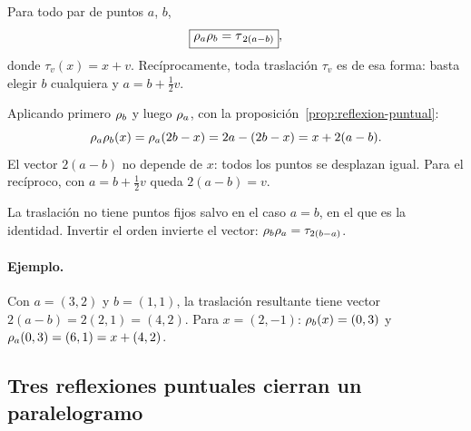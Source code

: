 \begin{proposicion}\label{prop:dos-puntuales}
Para todo par de puntos \(a\), \(b\),
\[
  \boxed{\rho_{a}\rho_{b}=\tau_{\,2(a-b)}},
\]
donde \(\tau_v(x)=x+v\). Recíprocamente, toda traslación \(\tau_v\) es de esa forma: basta elegir
\(b\) cualquiera y \(a=b+\tfrac12v\).
\end{proposicion}

\begin{demostracion}
Aplicando primero \(\rho_{b}\) y luego \(\rho_{a}\), con la
proposición~\ref{prop:reflexion-puntual}:
\[
  \rho_{a}\rho_{b}(x)=\rho_{a}(2b-x)=2a-(2b-x)=x+2(a-b).
\]
El vector \(2(a-b)\) no depende de \(x\): todos los puntos se desplazan igual. Para el
recíproco, con \(a=b+\frac12v\) queda \(2(a-b)=v\).
\end{demostracion}

La traslación no tiene puntos fijos salvo en el caso \(a=b\), en el que es la identidad.
Invertir el orden invierte el vector: \(\rho_{b}\rho_{a}=\tau_{2(b-a)}\).

\begin{center}
\end{center}

\paragraph{Ejemplo.}
Con \(a=(3,2)\) y \(b=(1,1)\), la traslación resultante tiene vector \(2(a-b)=2(2,1)=(4,2)\).
Para \(x=(2,-1)\): \(\rho_{b}(x)=(0,3)\) y
\(\rho_{a}(0,3)=(6,1)=x+(4,2)\).

\subsection{Tres reflexiones puntuales cierran un paralelogramo}\label{sec:tres-puntuales}

